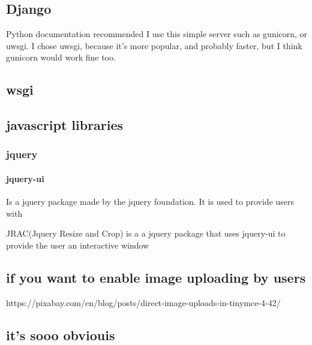 \subsection{Django}

Python documentation recommended I use this simple server such as gunicorn, or uwsgi.  I chose uwsgi, because it's more popular, and probably faster, but I think gunicorn would work fine too.


\subsection{wsgi}





\subsection{javascript libraries}

\subsubsection{jquery}

\paragraph{jquery-ui}

Is a jquery package made by the jquery foundation.  It is used to provide users with 


JRAC(Jquery Resize and Crop) is a a jquery package that uses jquery-ui to provide the user an interactive window 

\subsection{if you want to enable image uploading by users}

https://pixabay.com/en/blog/posts/direct-image-uploads-in-tinymce-4-42/

\subsection{it's sooo obviouis}


